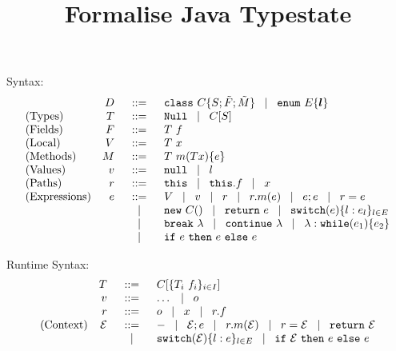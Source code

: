 \documentclass[a4paper]{llncs}
\title{Formalise Java Typestate}
\author{}
\newcommand{\class}{\ensuremath{\mathtt{class}}\xspace}
\newcommand{\enum}{\ensuremath{\mathtt{enum}}\xspace}
\newcommand{\Null}{\ensuremath{\mathtt{Null}}\xspace}
\newcommand{\nul}{\ensuremath{\mathtt{null}}\xspace}
\newcommand{\this}{\ensuremath{\mathtt{this}}\xspace}
\newcommand{\brk}[1]{\ensuremath{\mathtt{break}}\ #1}
\newcommand{\continue}[1]{\ensuremath{\mathtt{continue}}\ #1}
\newcommand{\return}[1]{\ensuremath{\mathtt{return}}\ #1}
\newcommand{\ctype}[2]{#1[#2]}
\newcommand{\base}{\ensuremath{\mathtt{base}}\xspace}
\newcommand{\method}[4]{#1\ #2(#3)\set{#4}}
\newcommand{\vdecl}[2]{#1\ #2}
\newcommand{\mcall}[2]{#1(#2)}
\newcommand{\newo}[1]{\ensuremath{\mathtt{new}\ #1()}}
\newcommand{\switch}[2]{\ensuremath{\mathtt{switch}(#1)\set{#2}}}
\newcommand{\while}[2]{\ensuremath{\mathtt{while}(#1)\set{#2}}}
\begin{document}
	\maketitle

	Syntax:
\[
	\begin{array}{lrcl}
		&D &\bnfis& \class\ C \set{S; \vect{F}; \vect{M}} \bnfbar \enum\ E \set{\vec{l}}\\
		\textrm{(Types)} & T &\bnfis& \Null \bnfbar \ctype{C}{S}\\%
		\textrm{(Fields)} &F &\bnfis& \vdecl{T}{f}\\		
		\textrm{(Local)} &V &\bnfis& \vdecl{T}{x}\\
		\textrm{(Methods)} &M &\bnfis& \method{T}{m}{T x}{e}\\
		\textrm{(Values)} &v& \bnfis& \nul \bnfbar l\\
		\textrm{(Paths)}  &r& \bnfis & \this \bnfbar \this.f \bnfbar x\\
		\textrm{(Expressions)} &e& \bnfis & V \bnfbar v \bnfbar r \bnfbar r.\mcall{m}{e} \bnfbar e;e \bnfbar r = e\\
		&&\bnfbar & \newo{C} \bnfbar \return{e} \bnfbar \switch{e}{l : e_l}_{l \in E} \\
		&&\bnfbar & \brk{\lambda} \bnfbar \continue \lambda \bnfbar{\lambda}: \while{e_1}{e_2}\\
		&&\bnfbar & \ifthenelse{e}{e}{e}
	\end{array}
\]

	Runtime Syntax:
\[
	\begin{array}{lrcl}
		& T & \bnfis & C[\set{T_i\ f_i}_{i \in I}]\\
		& v & \bnfis & \dots \bnfbar o\\
		& r & \bnfis & o \bnfbar x \bnfbar r.f \\
		\textrm{(Context)} & \mathcal{E} &\bnfis& \hole \bnfbar \mathcal{E}; e \bnfbar r.m(\mathcal{E}) \bnfbar r = \mathcal{E}
				\bnfbar \return{\mathcal{E}}\\
				&&\bnfbar& \switch{\mathcal{E}}{l:e}_{l \in E} \bnfbar \ifthenelse{\mathcal{E}}{e}{e}
	\end{array}
\]

%
%
\end{document}
